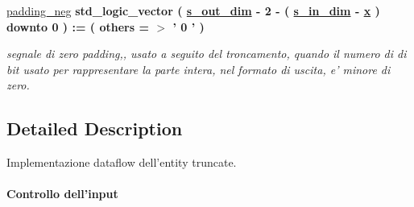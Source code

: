 \begin{DoxyCompactItemize}
\hyperlink{classtruncate_1_1dataflow_a130836df2917c4b75d1fc24500082e76}{padding\+\_\+neg} {\bfseries \textcolor{vhdlchar}{std\+\_\+logic\+\_\+vector}\textcolor{vhdlchar}{ }\textcolor{vhdlchar}{(}\textcolor{vhdlchar}{ }\textcolor{vhdlchar}{ }\textcolor{vhdlchar}{ }\textcolor{vhdlchar}{ }{\bfseries \hyperlink{classtruncate_a8b62f8bfecb0fab845995b8b051101bc}{s\+\_\+out\+\_\+dim}} \textcolor{vhdlchar}{-\/}\textcolor{vhdlchar}{ } \textcolor{vhdldigit}{2} \textcolor{vhdlchar}{-\/}\textcolor{vhdlchar}{ }\textcolor{vhdlchar}{(}\textcolor{vhdlchar}{ }\textcolor{vhdlchar}{ }\textcolor{vhdlchar}{ }\textcolor{vhdlchar}{ }{\bfseries \hyperlink{classtruncate_ad3d18243ad6fe53a2277e2aa9b94ca45}{s\+\_\+in\+\_\+dim}} \textcolor{vhdlchar}{-\/}\textcolor{vhdlchar}{ }\textcolor{vhdlchar}{ }\textcolor{vhdlchar}{ }{\bfseries \hyperlink{classtruncate_1_1dataflow_a63701d8af27da7452a7588efcff357bc}{x}} \textcolor{vhdlchar}{ }\textcolor{vhdlchar}{)}\textcolor{vhdlchar}{ }\textcolor{vhdlchar}{ }\textcolor{vhdlchar}{downto}\textcolor{vhdlchar}{ }\textcolor{vhdlchar}{ } \textcolor{vhdldigit}{0} \textcolor{vhdlchar}{ }\textcolor{vhdlchar}{)}\textcolor{vhdlchar}{ }\textcolor{vhdlchar}{ }\textcolor{vhdlchar}{ }\textcolor{vhdlchar}{\+:}\textcolor{vhdlchar}{=}\textcolor{vhdlchar}{ }\textcolor{vhdlchar}{(}\textcolor{vhdlchar}{ }\textcolor{vhdlchar}{ }\textcolor{vhdlchar}{others}\textcolor{vhdlchar}{ }\textcolor{vhdlchar}{ }\textcolor{vhdlchar}{=}\textcolor{vhdlchar}{ }\textcolor{vhdlchar}{$>$}\textcolor{vhdlchar}{ }\textcolor{vhdlchar}{'}\textcolor{vhdlchar}{ } \textcolor{vhdldigit}{0} \textcolor{vhdlchar}{ }\textcolor{vhdlchar}{'}\textcolor{vhdlchar}{ }\textcolor{vhdlchar}{)}\textcolor{vhdlchar}{ }} 
\begin{DoxyCompactList}\small\item\em segnale di zero padding,, usato a seguito del troncamento, quando il numero di di bit usato per rappresentare la parte intera, nel formato di uscita, e' minore di zero. \end{DoxyCompactList}\end{DoxyCompactItemize}


\subsection{Detailed Description}
Implementazione dataflow dell'entity truncate. 

\paragraph*{Controllo dell'input}

